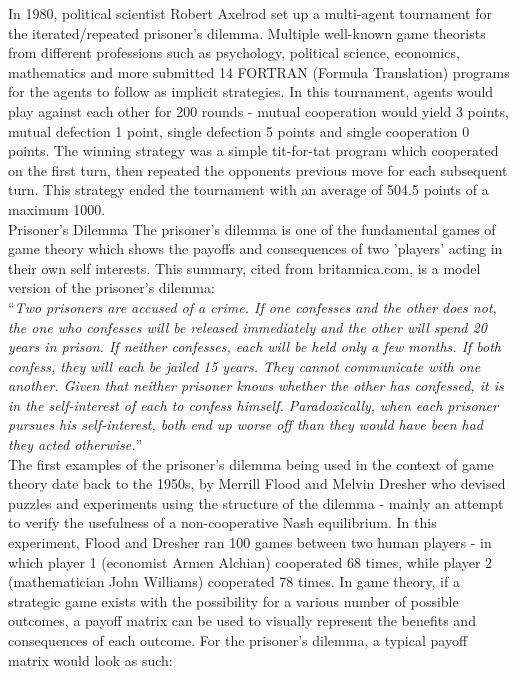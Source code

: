 \documentclass[12pt,a4paper]{article}
\makeatletter
\renewcommand\subsection{\@startsection {subsection}{1}{2mm}
                               {3pt plus 2pt minus 1pt}
                               {3pt plus 0pt}
                               {\normalfont\bfseries}}
\makeatother
\begin{document}
\noindent
In 1980, political scientist Robert Axelrod set up a multi-agent tournament for the iterated/repeated prisoner's dilemma\cite{3}. Multiple well-known game theorists from different professions such as psychology, political science, economics, mathematics and more submitted 14 FORTRAN (Formula Translation) programs for the agents to follow as implicit strategies. In this tournament, agents would play against each other for 200 rounds - mutual cooperation would yield 3 points, mutual defection 1 point, single defection 5 points and single cooperation 0 points. The winning strategy was a simple tit-for-tat program which cooperated on the first turn, then repeated the opponents previous move for each subsequent turn. This strategy ended the tournament with an average of 504.5 points of a maximum 1000. \\

\subsection{Prisoner's Dilemma}
The prisoner's dilemma is one of the fundamental games of game theory which shows the payoffs and consequences of two 'players' acting in their own self interests. This summary, cited from britannica.com\cite{48}, is a model version of the prisoner's dilemma: \\

\noindent
“\textit{Two prisoners are accused of a crime. If one confesses and the other does not, the one who confesses will be released immediately and the other will spend 20 years in prison. If neither confesses, each will be held only a few months. If both confess, they will each be jailed 15 years. They cannot communicate with one another. Given that neither prisoner knows whether the other has confessed, it is in the self-interest of each to confess himself. Paradoxically, when each prisoner pursues his self-interest, both end up worse off than they would have been had they acted otherwise.}” \\

\noindent
The first examples of the prisoner's dilemma being used in the context of game theory date back to the 1950s, by Merrill Flood and Melvin Dresher who devised puzzles and experiments using the structure of the dilemma - mainly an attempt to verify the usefulness of a non-cooperative Nash equilibrium. In this experiment, Flood and Dresher ran 100 games between two human players - in which player 1 (economist Armen Alchian) cooperated 68 times, while player 2 (mathematician John Williams) cooperated 78 times. In game theory, if a strategic game exists with the possibility for a various number of possible outcomes, a payoff matrix can be used to visually represent the benefits and consequences of each outcome. For the prisoner's dilemma, a typical payoff matrix would look as such:
\end{document}
